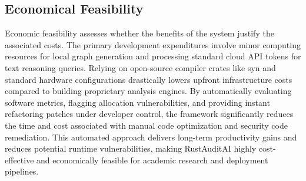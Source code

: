 \subsection{Economical Feasibility}
\hspace{0.5cm}
Economic feasibility assesses whether the benefits of the system justify the associated costs. The primary development expenditures involve minor computing resources for local graph generation and processing standard cloud API tokens for text reasoning queries. Relying on open-source compiler crates like syn and standard hardware configurations drastically lowers upfront infrastructure costs compared to building proprietary analysis engines.
By automatically evaluating software metrics, flagging allocation vulnerabilities, and providing instant refactoring patches under developer control, the framework significantly reduces the time and cost associated with manual code optimization and security code remediation. This automated approach delivers long-term productivity gains and reduces potential runtime vulnerabilities, making RustAuditAI highly cost-effective and economically feasible for academic research and deployment pipelines.





